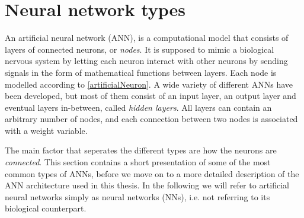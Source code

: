 \documentclass[twoside,english]{uiofysmaster}
\begin{document}
\section{Neural network types}
An artificial neural network (ANN), is a computational model that consists of layers of connected neurons, or \textit{nodes}. 
It is supposed to mimic a biological nervous system by letting each neuron interact with other neurons
by sending signals in the form of mathematical functions between layers. 
Each node is modelled according to \eqref{artificialNeuron}. 
A wide variety of different ANNs have
been developed, but most of them consist of an input layer, an output layer and eventual layers in-between, called
\textit{hidden layers}. All layers can contain an arbitrary number of nodes, and each connection between two nodes
is associated with a weight variable. 

The main factor that seperates the different types are how the neurons are \textit{connected}. 
This section contains a short presentation of some of the most common types of ANNs, before we move on to 
a more detailed description of the ANN architecture used in this thesis. In the following we will refer to artificial 
neural networks simply as neural networks (NNs), i.e. not referring to its biological counterpart.  
\end{document}
